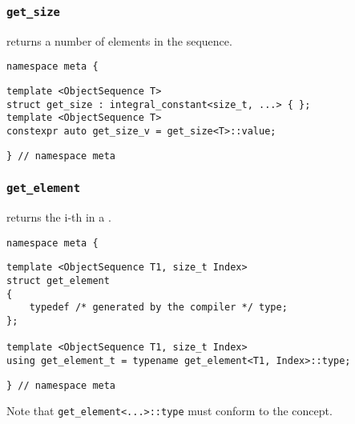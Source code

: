 

\subsubsection{\texttt{get\_size}}

returns a number of elements in the sequence.

\begin{verbatim}
namespace meta {
\end{verbatim}
\begin{verbatim}
template <ObjectSequence T>
struct get_size : integral_constant<size_t, ...> { };
template <ObjectSequence T>
constexpr auto get_size_v = get_size<T>::value;
\end{verbatim}
\begin{verbatim}
} // namespace meta
\end{verbatim}



\subsubsection{\texttt{get\_element}}

returns the i-th  in a .

\begin{verbatim}
namespace meta {
\end{verbatim}
\begin{verbatim}
template <ObjectSequence T1, size_t Index>
struct get_element
{
	typedef /* generated by the compiler */ type;
};
	
template <ObjectSequence T1, size_t Index>
using get_element_t = typename get_element<T1, Index>::type;

\end{verbatim}
\begin{verbatim}
} // namespace meta
\end{verbatim}


Note that \texttt{get\_element<...>::type}
must conform to the  concept.
